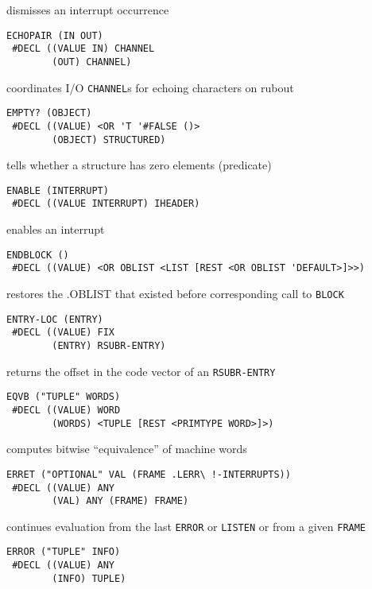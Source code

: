 \documentclass[a4paper]{scrbook}
\begin{document}
dismisses an interrupt occurrence

\begin{verbatim}
ECHOPAIR (IN OUT)
 #DECL ((VALUE IN) CHANNEL
        (OUT) CHANNEL)
\end{verbatim}

coordinates I/O \texttt{CHANNEL}s for echoing characters on rubout

\begin{verbatim}
EMPTY? (OBJECT)
 #DECL ((VALUE) <OR 'T '#FALSE ()>
        (OBJECT) STRUCTURED)
\end{verbatim}

tells whether a structure has zero elements (predicate)

\begin{verbatim}
ENABLE (INTERRUPT)
 #DECL ((VALUE INTERRUPT) IHEADER)
\end{verbatim}

enables an interrupt

\begin{verbatim}
ENDBLOCK ()
 #DECL ((VALUE) <OR OBLIST <LIST [REST <OR OBLIST 'DEFAULT>]>>)
\end{verbatim}

restores the .OBLIST that existed before corresponding call to \texttt{BLOCK}

\begin{verbatim}
ENTRY-LOC (ENTRY)
 #DECL ((VALUE) FIX
        (ENTRY) RSUBR-ENTRY)
\end{verbatim}

returns the offset in the code vector of an \texttt{RSUBR-ENTRY}

\begin{verbatim}
EQVB ("TUPLE" WORDS)
 #DECL ((VALUE) WORD
        (WORDS) <TUPLE [REST <PRIMTYPE WORD>]>)
\end{verbatim}

computes bitwise ``equivalence'' of machine words

\begin{verbatim}
ERRET ("OPTIONAL" VAL (FRAME .LERR\ !-INTERRUPTS))
 #DECL ((VALUE) ANY
        (VAL) ANY (FRAME) FRAME)
\end{verbatim}

continues evaluation from the last \texttt{ERROR} or \texttt{LISTEN} or from a given \texttt{FRAME}

\begin{verbatim}
ERROR ("TUPLE" INFO)
 #DECL ((VALUE) ANY
        (INFO) TUPLE)
\end{verbatim}
\end{document}
